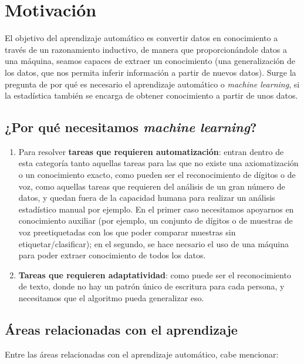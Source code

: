 \section{Motivación}

El objetivo del aprendizaje automático es convertir datos en conocimiento a través de un razonamiento inductivo, de manera que
proporcionándole datos a una máquina, seamos capaces de extraer un conocimiento (una generalización de los datos, que nos permita
inferir información a partir de nuevos datos). Surge la pregunta de por qué es necesario el aprendizaje automático o 
\textit{machine learning}, si la estadística también se encarga de obtener conocimiento a partir de unos datos.

\subsection{¿Por qué necesitamos \textit{machine learning}?}
\begin{enumerate}[i]
 \item Para resolver \textbf{tareas que requieren automatización}: entran dentro de esta categoría tanto aquellas tareas para
 las que no existe una axiomatización o un conocimiento exacto, como pueden ser el reconocimiento de dígitos o de voz, como 
 aquellas tareas que requieren del análisis de un gran número de datos, y quedan fuera de la capacidad humana para realizar
 un análisis estadístico manual por ejemplo. En el primer caso necesitamos apoyarnos en conocimiento auxiliar (por ejemplo, 
 un conjunto de dígitos o de muestras de voz preetiquetadas con los que poder comparar muestras sin etiquetar/clasificar); 
 en el segundo, se hace necsario el uso de una máquina para poder extraer conocimiento de todos los datos.
 
 \item \textbf{Tareas que requieren adaptatividad}: como puede ser el reconocimiento de texto, donde no hay un patrón único de
 escritura para cada persona, y necesitamos que el algoritmo pueda generalizar eso.
\end{enumerate}

\subsection{Áreas relacionadas con el aprendizaje}
Entre las áreas relacionadas con el aprendizaje automático, cabe mencionar:

